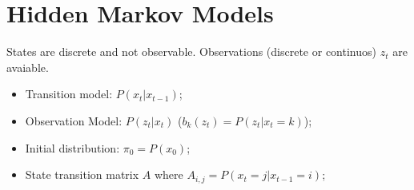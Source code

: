 \section{Hidden Markov Models}

States are discrete and not observable. Observations (discrete or continuos) $z_t$ are avaiable.

\begin{itemize}
    \item Transition model: $P(x_t|x_{t-1})$;
    \item Observation Model: $P(z_t|x_t)$ ($b_k(z_t) = P(z_t|x_t=k)$);
    \item Initial distribution: $\pi_0 = P(x_0)$;
    \item State transition matrix $A$ where $A_{i,j} = P(x_t = j | x_{t-1} = i)$;
\end{itemize}


